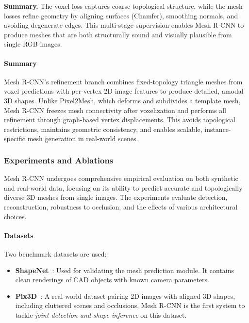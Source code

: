 \medskip
\noindent
\textbf{Summary.}  
The voxel loss captures coarse topological structure, while the mesh losses refine geometry by aligning surfaces (Chamfer), smoothing normals, and avoiding degenerate edges. This multi-stage supervision enables Mesh R-CNN to produce meshes that are both structurally sound and visually plausible from single RGB images.

\paragraph{Summary}

Mesh R-CNN’s refinement branch combines fixed-topology triangle meshes from voxel predictions with per-vertex 2D image features to produce detailed, amodal 3D shapes. Unlike Pixel2Mesh, which deforms and subdivides a template mesh, Mesh R-CNN freezes mesh connectivity after voxelization and performs all refinement through graph-based vertex displacements. This avoids topological restrictions, maintains geometric consistency, and enables scalable, instance-specific mesh generation in real-world scenes.

\subsubsection{Experiments and Ablations}
\label{subsec:chapter23_meshrcnn_experiments}

Mesh R-CNN undergoes comprehensive empirical evaluation on both synthetic and real-world data, focusing on its ability to predict accurate and topologically diverse 3D meshes from single images. The experiments evaluate detection, reconstruction, robustness to occlusion, and the effects of various architectural choices.

\paragraph{Datasets}
Two benchmark datasets are used:
\begin{itemize}
    \item \textbf{ShapeNet}~\cite{chang2015_shapenet}: Used for validating the mesh prediction module. It contains clean renderings of CAD objects with known camera parameters.
    \item \textbf{Pix3D}~\cite{sun2018_pix3d}: A real-world dataset pairing 2D images with aligned 3D shapes, including cluttered scenes and occlusions. Mesh R-CNN is the first system to tackle \emph{joint detection and shape inference} on this dataset.
\end{itemize}

